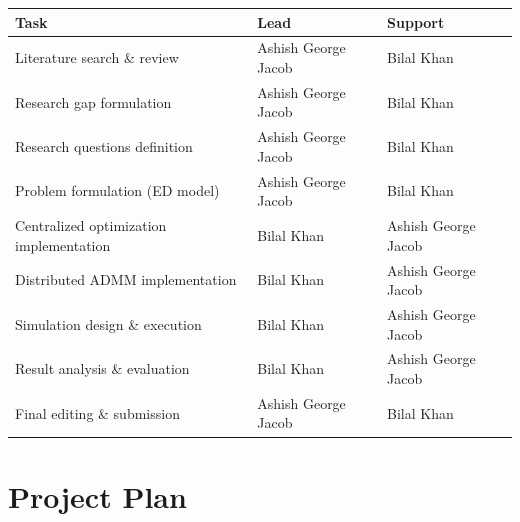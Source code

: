 \documentclass[12pt, a4paper]{article}
\begin{document}
\begin{center}
\begin{tabular}{@{} p{5.8cm} p{3.8cm} p{3.8cm} @{}}
  \toprule
  \textbf{Task} & \textbf{Lead} & \textbf{Support} \\
  \midrule
  
  Literature search \& review & Ashish George Jacob & Bilal Khan \\
  Research gap formulation & Ashish George Jacob & Bilal Khan \\
  
  Research questions definition & Ashish George Jacob & Bilal Khan \\
  Problem formulation (ED model) & Ashish George Jacob & Bilal Khan \\
  
  Centralized optimization implementation & Bilal Khan & Ashish George Jacob \\
  Distributed ADMM implementation & Bilal Khan & Ashish George Jacob \\
  
  Simulation design \& execution & Bilal Khan & Ashish George Jacob \\
  Result analysis \& evaluation & Bilal Khan & Ashish George Jacob \\
  
  Final editing \& submission & Ashish George Jacob & Bilal Khan \\
  
  \bottomrule
\end{tabular}
\end{center}


\section{Project Plan}
\end{document}
